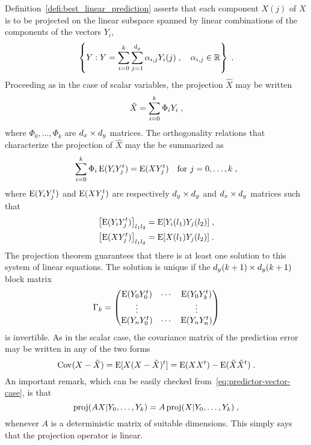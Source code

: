 Definition~\ref{defi:best_linear_prediction} asserts that each component $X(j)$ of $X$ is to be projected on the linear subspace spanned by linear combinations of the components of the vectors $Y_i$,
\begin{equation*}
\left \{ Y : Y = \sum_{i=0}^k \sum_{j=1}^{d_y} \alpha_{i,j} Y_i(j) \; , \quad \alpha_{i,j} \in \mathbb{R} \right\} \; .
\end{equation*}
Proceeding as in the case of scalar variables, the projection $\hat{X}$ may be written
\begin{equation*}
\hat{X} =  \sum_{i=0}^k \Phi_i Y_i \; ,
\end{equation*}
where $\Phi_0, \dotsc, \Phi_k$ are $d_x \times d_y$ matrices. The
orthogonality relations that characterize the projection of $\hat{X}$ may the
be summarized as
\begin{equation}
\label{eq:predictor-vector-case}
 \sum_{i=0}^k \Phi_i \operatorname{E}(Y_i Y_j^t) = \operatorname{E}(X Y_j^t)
 \quad \text{for $j=0, \dots, k$} \; ,
\end{equation}
where $\operatorname{E}(Y_i Y_j^t)$ and $\operatorname{E}(X Y_j^t)$ are respectively $d_y \times d_y$ and $d_x \times d_y$ matrices such that
\begin{align*}
\left[\operatorname{E}(Y_i Y_j^t)\right]_{l_1 l_2} & = \operatorname{E}[Y_i(l_1) Y_j(l_2)] \; , \\
\left[\operatorname{E}(X Y_j^t)\right]_{l_1 l_2} & = \operatorname{E}[X(l_1) Y_j(l_2)] \; .
\end{align*}
The projection theorem guarantees that there is at least one solution to this system of linear equations. The solution is unique if the $d_y(k+1) \times d_y(k+1)$ block matrix
$$
\Gamma_k =
\begin{pmatrix}
  \operatorname{E}(Y_0 Y_0^t) & \cdots & \operatorname{E}(Y_0 Y_k^t) \\
  \vdots & & \vdots \\
  \operatorname{E}(Y_n Y_0^t) & \cdots & \operatorname{E}(Y_n Y_n^t)
\end{pmatrix}
$$
is invertible. As in the scalar case, the covariance matrix of the
prediction error may be written in any of the two forms
\begin{equation}
  \label{eq:proj_error:cov}
  \operatorname{Cov}(X-\hat{X}) = \operatorname{E}[X(X-\hat{X})^t] = \operatorname{E}(X X^t) - \operatorname{E}(\hat{X} \hat{X}^t) \; .
\end{equation}
An important remark, which can be easily checked from~\eqref{eq:predictor-vector-case}, is that
\begin{equation}
\label{eq:property-projection-matrix}
\operatorname{proj}({AX}|Y_0,\dots,Y_k) = A \operatorname{proj}({X}|Y_0,\dots,Y_k) \; ,
\end{equation}
whenever $A$ is a deterministic matrix of suitable dimensions.
This simply says that the projection operator is linear.


